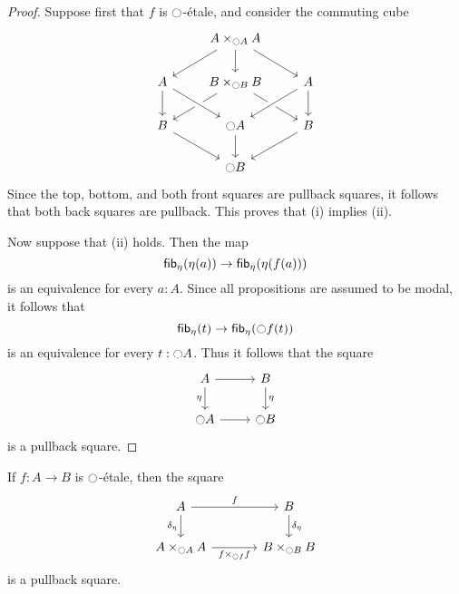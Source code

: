 \documentclass[9pt,twosided]{amsart}
\begin{document}
\begin{proof}
Suppose first that $f$ is ${\ocircle}$-\'etale, and consider the commuting cube
\begin{equation*}
\begin{tikzcd}
& A\times_{\modal A} A \arrow[dl] \arrow[d] \arrow[dr] \\
A \arrow[d] & B\times_{\modal B} B \arrow[dl] \arrow[dr] & A \arrow[dl,crossing over] \arrow[d] \\
B \arrow[dr] & \modal A \arrow[from=ul,crossing over] \arrow[d] & B \arrow[dl] \\
& \modal B
\end{tikzcd}
\end{equation*}
Since the top, bottom, and both front squares are pullback squares, it follows that both back squares are pullback. This proves that (i) implies (ii).

Now suppose that (ii) holds. Then the map
\begin{equation*}
\fib{\modalunit}{\modalunit(a)}\to \fib{\modalunit}{\modalunit(f(a))}
\end{equation*}
is an equivalence for every $a:A$. Since all propositions are assumed to be modal, it follows that
\begin{equation*}
\fib{\modalunit}{t}\to \fib{\modalunit}{\modal f(t)}
\end{equation*}
is an equivalence for every $t:{\ocircle} A$. Thus it follows that the square
\begin{equation*}
\begin{tikzcd}
A \arrow[d,swap,"\modalunit"] \arrow[r] & B \arrow[d,"\modalunit"] \\
\modal A \arrow[r] & \modal B
\end{tikzcd}
\end{equation*}
is a pullback square.
\end{proof}

\begin{cor}
If $f:A\to B$ is ${\ocircle}$-\'etale, then the square
\begin{equation*}
\begin{tikzcd}[column sep=large]
A \arrow[d,swap,"\delta_{\modalunit}"] \arrow[r,"f"] & B \arrow[d,"\delta_{\modalunit}"] \\
A\times_{\modal A} A \arrow[r,swap,"f\times_{\modal f}f"] & B\times_{\modal B} B
\end{tikzcd}
\end{equation*}
is a pullback square.
\end{cor}
\end{document}
